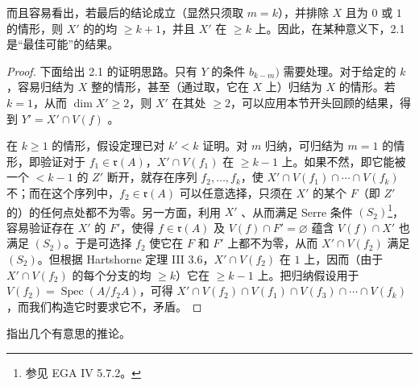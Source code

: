 而且容易看出，若最后的结论成立（显然只须取 $m=k$），并排除 $X$ 且为 $0$ 或 $1$ 的情形，则 $X'$ 的的均 $\geq k+1$，并且 $X'$ 在 $\geq k$ 上。因此，在某种意义下，2.1 是“最佳可能”的结果。

\begin{proof}
下面给出 2.1 的证明思路。只有 $Y$ 的条件 $b_{k-m})$ 需要处理。对于给定的 $k$，容易归结为 $X$ 整的情形，甚至（通过取，它在 $X$ 上）归结为 $X$ 的情形。若 $k=1$，从而 $\dim X'\geq2$，则 $X'$ 在其处 $\geq2$，可以应用本节开头回顾的结果，得到 $Y'=X'\cap V(f)$ 。

在 $k\geq1$ 的情形，假设定理已对 $k'<k$ 证明。对 $m$ 归纳，可归结为 $m=1$ 的情形，即验证对于 $f_1\in\mathfrak r(A)$，$X'\cap V(f_1)$ 在 $\geq k-1$ 上。如果不然，即它能被一个 $<k-1$ 的 $Z'$ 断开，就存在序列 $f_2,\ldots,f_k$，使 $X'\cap V(f_1)\cap\cdots\cap V(f_k)$ 不；而在这个序列中，$f_2\in\mathfrak r(A)$ 可以任意选择，只须在 $X'$ 的某个 $F$（即 $Z'$ 的）的任何点处都不为零。另一方面，利用 $X'$ 、从而满足 Serre 条件 $(S_2)$\footnote{参见 EGA IV 5.7.2。}，容易验证存在 $X'$ 的 $F'$，使得 $f\in\mathfrak r(A)$ 及 $V(f)\cap F'=\varnothing$ 蕴含 $V(f)\cap X'$ 也满足 $(S_2)$。于是可选择 $f_2$ 使它在 $F$ 和 $F'$ 上都不为零，从而 $X'\cap V(f_2)$ 满足 $(S_2)$。但根据 Hartshorne 定理 III 3.6，$X'\cap V(f_2)$ 在 $1$ 上，因而（由于 $X'\cap V(f_2)$ 的每个分支的均 $\geq k$）它在 $\geq k-1$ 上。把归纳假设用于 $V(f_2)=\operatorname{Spec}(A/f_2A)$，可得 $X'\cap V(f_2)\cap V(f_1)\cap V(f_3)\cap\cdots\cap V(f_k)$ ，而我们构造它时要求它不，矛盾。
\end{proof}
指出几个有意思的推论。


